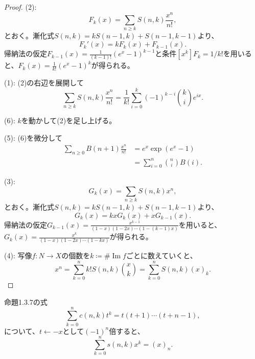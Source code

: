 \documentclass[xelatex,ja=standard,a4paper,14pt,everyparhook=compat]{bxjsarticle}
\theoremstyle{definition}
\begin{document}
\begin{proof}
    (2): \begin{equation*}
        F_k(x) = \sum_{n \geq k} S(n,k) \frac{x^n}{n!},
    \end{equation*}
    とおく。漸化式$S(n,k) = kS(n-1,k) + S(n-1,k-1)$より、 \begin{equation*}
        F_k'(x) = kF_k(x) + F_{k-1}(x).
    \end{equation*}
    帰納法の仮定$F_{k-1}(x) = \frac{1}{(k-1)!} (e^x-1)^{k-1}$と条件$[x^k]F_k = 1/k!$を用いると、$F_k(x) = \frac{1}{k!} (e^x-1)^k$が得られる。

    (1): (2)の右辺を展開して \begin{equation*}
        \sum_{n \geq k} S(n,k) \frac{x^n}{n!}
        = \frac{1}{k!} \sum_{i=0}^k (-1)^{k-i} \binom{k}{i} e^{ix}.
    \end{equation*}

    (6): $k$を動かして(2)を足し上げる。

    (5): (6)を微分して \begin{align*}
        \sum_{n \geq 0} B(n+1) \frac{x^n}{n!}
         & = e^x \exp(e^x-1)                 \\
         & = \sum_{i=0}^n \binom{n}{i} B(i).
    \end{align*}

    (3): \begin{equation*}
        G_k(x) = \sum_{n \geq k} S(n,k) x^n,
    \end{equation*}
    とおく。漸化式$S(n,k) = kS(n-1,k) + S(n-1,k-1)$より、 \begin{equation*}
        G_k(x) = kxG_k(x) + xG_{k-1}(x).
    \end{equation*}
    帰納法の仮定$G_{k-1}(x) = \frac{x^{k-1}}{(1-x)(1-2x)\cdots(1-(k-1)x)}$を用いると、$G_k(x) = \frac{x^k}{(1-x)(1-2x)\cdots(1-kx)}$が得られる。

    (4): 写像$f:N \to X$の個数を$k \coloneqq \#\operatorname{Im} f$ごとに数えていくと、 \begin{equation*}
        x^n = \sum_{k=0}^n k! S(n,k) \binom{x}{k} = \sum_{k=0}^n S(n,k) (x)_k.
    \end{equation*}
\end{proof}

命題1.3.7の式
\begin{equation*}
    \sum_{k=0}^n c(n,k) t^k = t(t+1)\cdots(t+n-1),
\end{equation*}
について、$t \gets -x$として$(-1)^n$倍すると、 \begin{equation}
    \sum_{k=0}^n s(n,k) x^k = (x)_n.
\end{equation}
\end{document}
